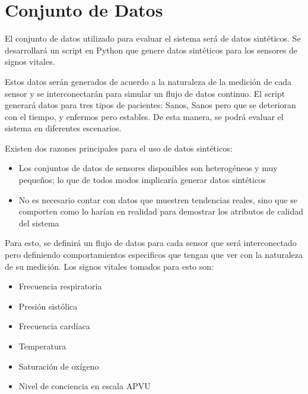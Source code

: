 \section{Conjunto de Datos}

El conjunto de datos utilizado para evaluar el sistema será de datos sintéticos. 
Se desarrollará un script en Python que genere datos sintéticos para los sensores de signos vitales.\newline

Estos datos serán generados de acuerdo a la naturaleza de la medición de cada sensor y se interconectarán para simular un flujo de datos continuo.
El script generará datos para tres tipos de pacientes: Sanos, Sanos pero que se deterioran con el tiempo, y enfermos pero estables. 
De esta manera, se podrá evaluar el sistema en diferentes escenarios.\newline

Existen dos razones principales para el uso de datos sintéticos: 

\begin{itemize}
    \item Los conjuntos de datos de sensores disponibles son heterogéneos y muy pequeños; lo que de todos modos implicaría generar datos sintéticos
    \item No es necesario contar con datos que muestren tendencias reales, sino que se comporten como lo harían en realidad para demostrar los atributos de calidad del sistema
\end{itemize}

Para esto, se definirá un flujo de datos para cada sensor que será interconectado pero definiendo comportamientos especificos que tengan que ver con la naturaleza de su medición.
Los signos vitales tomados para esto son: 

\begin{itemize}
    \item Frecuencia respiratoria
    \item Presión sistólica
    \item Frecuencia cardíaca
    \item Temperatura
    \item Saturación de oxígeno
    \item Nivel de conciencia en escala APVU
\end{itemize}